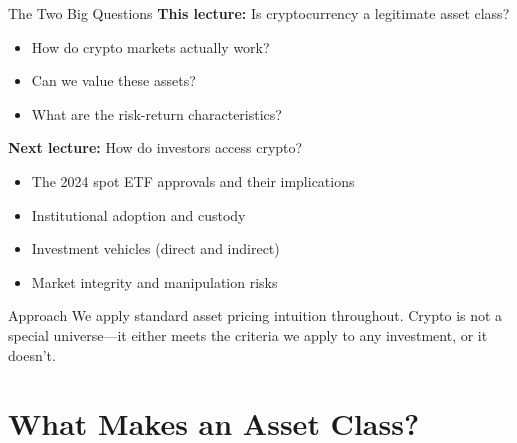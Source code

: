 \documentclass[10pt]{beamer}
\begin{document}
\begin{frame}{The Two Big Questions}
  \textbf{This lecture:} Is cryptocurrency a legitimate asset class?
  \begin{itemize}
    \item How do crypto markets actually work?
    \item Can we value these assets?
    \item What are the risk-return characteristics?
  \end{itemize}
  
  \vspace{1em}
  \textbf{Next lecture:} How do investors access crypto?
  \begin{itemize}
    \item The 2024 spot ETF approvals and their implications
    \item Institutional adoption and custody
    \item Investment vehicles (direct and indirect)
    \item Market integrity and manipulation risks
  \end{itemize}
  
  \vspace{1em}
  \begin{block}{Approach}
    We apply standard asset pricing intuition throughout. Crypto is not a special universe---it either meets the criteria we apply to any investment, or it doesn't.
  \end{block}
\end{frame}

\section{What Makes an Asset Class?}
\end{document}
